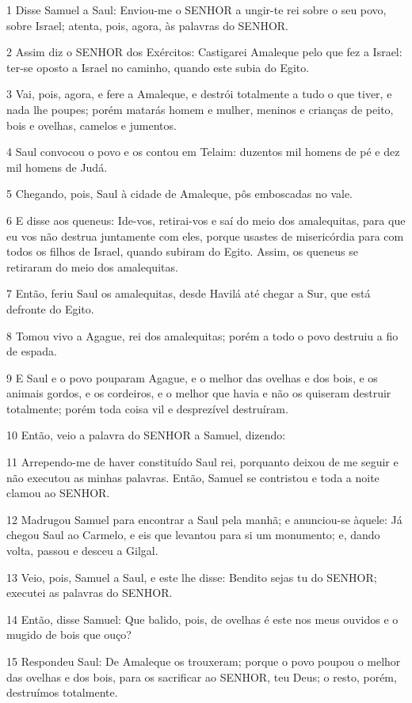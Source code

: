 \par 1 Disse Samuel a Saul: Enviou-me o SENHOR a ungir-te rei sobre o seu povo, sobre Israel; atenta, pois, agora, às palavras do SENHOR.
\par 2 Assim diz o SENHOR dos Exércitos: Castigarei Amaleque pelo que fez a Israel: ter-se oposto a Israel no caminho, quando este subia do Egito.
\par 3 Vai, pois, agora, e fere a Amaleque, e destrói totalmente a tudo o que tiver, e nada lhe poupes; porém matarás homem e mulher, meninos e crianças de peito, bois e ovelhas, camelos e jumentos.
\par 4 Saul convocou o povo e os contou em Telaim: duzentos mil homens de pé e dez mil homens de Judá.
\par 5 Chegando, pois, Saul à cidade de Amaleque, pôs emboscadas no vale.
\par 6 E disse aos queneus: Ide-vos, retirai-vos e saí do meio dos amalequitas, para que eu vos não destrua juntamente com eles, porque usastes de misericórdia para com todos os filhos de Israel, quando subiram do Egito. Assim, os queneus se retiraram do meio dos amalequitas.
\par 7 Então, feriu Saul os amalequitas, desde Havilá até chegar a Sur, que está defronte do Egito.
\par 8 Tomou vivo a Agague, rei dos amalequitas; porém a todo o povo destruiu a fio de espada.
\par 9 E Saul e o povo pouparam Agague, e o melhor das ovelhas e dos bois, e os animais gordos, e os cordeiros, e o melhor que havia e não os quiseram destruir totalmente; porém toda coisa vil e desprezível destruíram.
\par 10 Então, veio a palavra do SENHOR a Samuel, dizendo:
\par 11 Arrependo-me de haver constituído Saul rei, porquanto deixou de me seguir e não executou as minhas palavras. Então, Samuel se contristou e toda a noite clamou ao SENHOR.
\par 12 Madrugou Samuel para encontrar a Saul pela manhã; e anunciou-se àquele: Já chegou Saul ao Carmelo, e eis que levantou para si um monumento; e, dando volta, passou e desceu a Gilgal.
\par 13 Veio, pois, Samuel a Saul, e este lhe disse: Bendito sejas tu do SENHOR; executei as palavras do SENHOR.
\par 14 Então, disse Samuel: Que balido, pois, de ovelhas é este nos meus ouvidos e o mugido de bois que ouço?
\par 15 Respondeu Saul: De Amaleque os trouxeram; porque o povo poupou o melhor das ovelhas e dos bois, para os sacrificar ao SENHOR, teu Deus; o resto, porém, destruímos totalmente.
